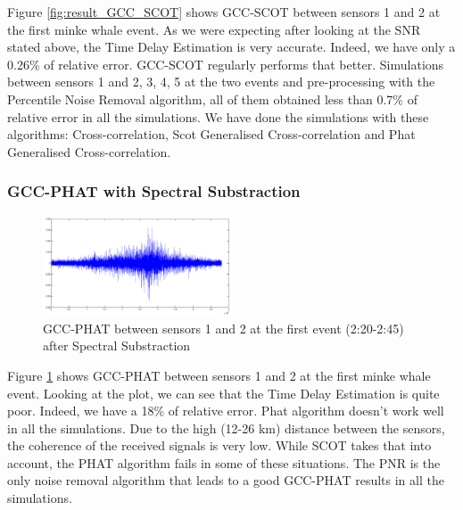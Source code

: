       Figure \ref{fig:result_GCC_SCOT} shows GCC-SCOT between sensors 1 and 2 at the first minke whale event. As we were expecting after looking at the SNR stated above, the Time Delay Estimation is very accurate. Indeed, we have only a 0.26\% of relative error. GCC-SCOT regularly performs that better. Simulations between sensors 1 and 2, 3, 4, 5 at the two events and pre-processing with the Percentile Noise Removal algorithm, all of them obtained less than 0.7\% of relative error in all the simulations. We have done the simulations with these algorithms: Cross-correlation, Scot Generalised Cross-correlation and Phat Generalised Cross-correlation.
  
    \subsubsection{GCC-PHAT with Spectral Substraction}
    
    \begin{figure}[htb]
      \begin{center}
	      \includegraphics[width=0.5\textwidth]{figures/6gcc_Phat_SS_12_1.png}
      \end{center}
      \caption{GCC-PHAT between sensors 1 and 2 at the first event (2:20-2:45) after Spectral Substraction}
      \label{fig:result_GCC_PHAT}
    \end{figure}
      
    Figure \ref{fig:result_GCC_PHAT} shows GCC-PHAT between sensors 1 and 2 at the first minke whale event. Looking at the plot, we can see that the Time Delay Estimation is quite poor. Indeed, we have a 18\% of relative error. Phat algorithm doesn't work well in all the simulations. Due to the high (12-26 km) distance between the sensors, the coherence of the received signals is very low. While SCOT takes that into account, the PHAT algorithm fails in some of these situations. The PNR is the only noise removal algorithm that leads to a good GCC-PHAT results in all the simulations.
